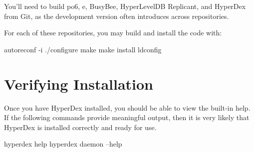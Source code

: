 You'll need to build po6, e, BusyBee, HyperLevelDB Replicant, and HyperDex from
Git, as the development version often introduces across repositories.

For each of these repositories, you may build and install the code with:

\begin{consolecode}
autoreconf -i
./configure
make
make install
ldconfig
\end{consolecode}

\section{Verifying Installation}

Once you have HyperDex installed, you should be able to view the built-in help.
If the following commands provide meaningful output, then it is very likely that
HyperDex is installed correctly and ready for use.

\begin{consolecode}
hyperdex help
hyperdex daemon --help
\end{consolecode}
